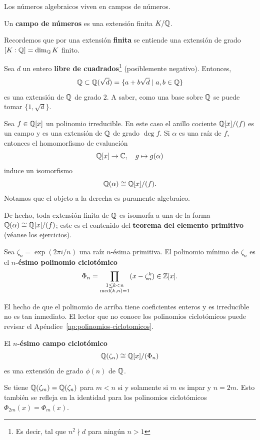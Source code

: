\vspace{1em}

Los números algebraicos viven en campos de números.

\begin{definicion}
  Un \textbf{campo de números} es una extensión finita $K/\mathbb{Q}$.
\end{definicion}

Recordemos que por una extensión \textbf{finita} se entiende una extensión de
grado $[K : \mathbb{Q}] = \dim_{\mathbb{Q}} K$ finito.

\begin{ejemplo}
  Sea $d$ un entero \textbf{libre de cuadrados}\footnote{Es decir,
    tal que $n^2 \nmid d$ para ningún $n > 1$} (posiblemente negativo). Entonces,
  $$\mathbb{Q} \subset \mathbb{Q} (\sqrt{d}) = \{ a + b\sqrt{d} \mid a,b \in \mathbb{Q} \}$$
  es una extensión de $\mathbb{Q}$ de grado $2$. A saber, como una base sobre $\mathbb{Q}$ se
  puede tomar $\{ 1, \sqrt{d} \}$.
\end{ejemplo}

\begin{ejemplo}
  Sea $f \in \mathbb{Q} [x]$ un polinomio irreducible. En este caso el anillo cociente
  $\mathbb{Q} [x]/(f)$ es un campo y es una extensión de $\mathbb{Q}$ de grado $\deg f$.
  Si $\alpha$ es una raíz de $f$, entonces el homomorfismo de evaluación
  $$\mathbb{Q} [x] \to \mathbb{C}, \quad g \mapsto g(\alpha)$$
  induce un isomorfismo
  $$\mathbb{Q} (\alpha) \cong \mathbb{Q} [x]/(f).$$
  Notamos que el objeto a la derecha es puramente algebraico.

  De hecho, toda extensión finita de $\mathbb{Q}$ es isomorfa a una de la forma
  $\mathbb{Q} (\alpha) \cong \mathbb{Q} [x]/(f)$; este es el contenido del
  \textbf{teorema del elemento primitivo} (véanse los ejercicios).
\end{ejemplo}

\begin{ejemplo}
  Sea $\zeta_n = \exp (2\pi i/n)$ una raíz $n$-ésima primitiva. El polinomio
  mínimo de $\zeta_n$ es el \textbf{$n$-ésimo polinomio ciclotómico}
  \[ \Phi_n = \prod_{\substack{1 \le k < n \\ \operatorname{mcd} (k,n) = 1}} (x - \zeta_n^k)
       \in \mathbb{Z} [x]. \]

  El hecho de que el polinomio de arriba tiene coeficientes enteros y es
  irreducible no es tan inmediato. El lector que no conoce los polinomios
  ciclotómicos puede revisar el Apéndice~\ref{ap:polinomios-ciclotomicos}.

  El \textbf{$n$-ésimo campo ciclotómico}
  $$\mathbb{Q} (\zeta_n) \cong \mathbb{Q} [x] / (\Phi_n)$$
  es una extensión de grado $\phi (n)$ de $\mathbb{Q}$.

  Se tiene $\mathbb{Q} (\zeta_m) = \mathbb{Q} (\zeta_n)$ para $m < n$ si y solamente si $m$ es
  impar y $n = 2m$. Esto también se refleja en la identidad para los polinomios
  ciclotómicos $\Phi_{2m} (x) = \Phi_m (x)$.
\end{ejemplo}

